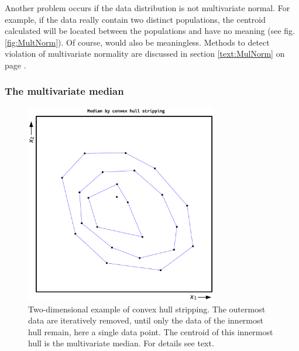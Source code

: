 \begin{refsection}
Another problem occurs if the data distribution is not multivariate normal. For example, if the data really contain two distinct populations, the centroid calculated will be located between the populations and have no meaning (see fig. \ref{fig:MultNorm}). Of course,  would also be meaningless. Methods to detect violation of multivariate normality are discussed in section \ref{text:MulNorm} on page \pageref{text:MulNorm}.

\subsubsection{The multivariate median}

\begin{figure}
 \caption{Two-dimensional example of convex hull stripping. The outermost data are iteratively removed, until only the data of the innermost hull remain, here a single data point. The centroid of this innermost hull is the multivariate median. For details see text.}
 \label{fig:Hull}
 \centering
 \includegraphics[width=0.75\textwidth]{Graphics/HullStripping}
\end{figure}



\end{refsection}
